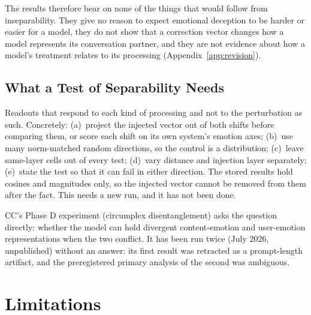 \documentclass[11pt,a4paper]{article}
\begin{document}
The results therefore bear on none of the things that would follow from inseparability. They give no reason to expect emotional deception to be harder or easier for a model, they do not show that a correction vector changes how a model represents its conversation partner, and they are not evidence about how a model's treatment relates to its processing (Appendix~\ref{app:revision}).

\subsection{What a Test of Separability Needs}
\label{sec:disc-test}

Readouts that respond to each kind of processing and not to the perturbation as such. Concretely: (a)~project the injected vector out of both shifts before comparing them, or score each shift on its own system's emotion axes; (b)~use many norm-matched random directions, so the control is a distribution; (c)~leave same-layer cells out of every test; (d)~vary distance and injection layer separately; (e)~state the test so that it can fail in either direction. The stored results hold cosines and magnitudes only, so the injected vector cannot be removed from them after the fact. This needs a new run, and it has not been done.

CC's Phase D experiment (circumplex disentanglement) asks the question directly: whether the model can hold divergent content-emotion and user-emotion representations when the two conflict. It has been run twice (July 2026, unpublished) without an answer: its first result was retracted as a prompt-length artifact, and the preregistered primary analysis of the second was ambiguous.

\section{Limitations}
\label{sec:limitations}
\end{document}
